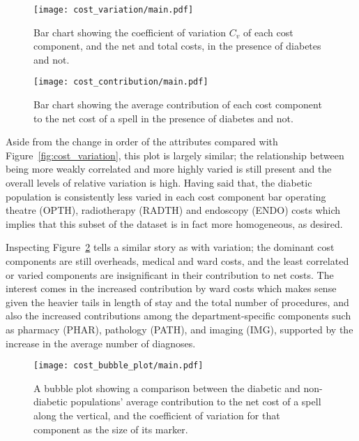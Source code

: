 \begin{figure}[h]
    \centering
    \texttt{[image: cost\_variation/main.pdf]}
    \caption{Bar chart showing the coefficient of variation \(C_{v}\) of each
        cost component, and the net and total costs, in the presence of diabetes
        and not.}%
    \label{fig:diab_variation}
\end{figure}

\begin{figure}[h]
    \centering
    \texttt{[image: cost\_contribution/main.pdf]}
    \caption{Bar chart showing the average contribution of each cost component
        to the net cost of a spell in the presence of diabetes and not.}%
    \label{fig:diab_contribution}
\end{figure}

Aside from the change in order of the attributes compared with
Figure~\ref{fig:cost_variation}, this plot is largely similar; the relationship
between being more weakly correlated and more highly varied is still present and
the overall levels of relative variation is high. Having said that, the diabetic
population is consistently less varied in each cost component bar operating
theatre (OPTH), radiotherapy (RADTH) and endoscopy (ENDO) costs which implies
that this subset of the dataset is in fact more homogeneous, as desired.

Inspecting Figure~\ref{fig:diab_contribution} tells a similar story as with
variation; the dominant cost components are still overheads, medical and ward
costs, and the least correlated or varied components are insignificant in their
contribution to net costs. The interest comes in the increased contribution by
ward costs which makes sense given the heavier tails in length of stay and the
total number of procedures, and also the increased contributions among the
department-specific components such as pharmacy (PHAR), pathology (PATH), and
imaging (IMG), supported by the increase in the average number of diagnoses.

\begin{figure}[htbp]
    \centering
    \texttt{[image: cost\_bubble\_plot/main.pdf]}
    \caption{A bubble plot showing a comparison between the diabetic and
        non-diabetic populations' average contribution to the net cost of a
        spell along the vertical, and the coefficient of variation for that
        component as the size of its marker.}%
    \label{fig:diab_bubble_plot}
\end{figure}

